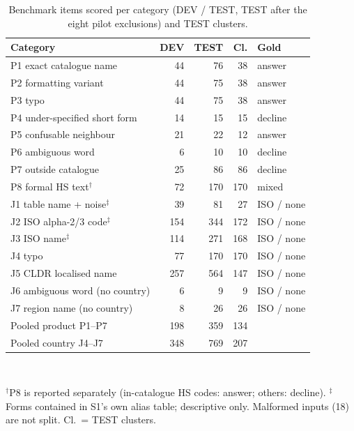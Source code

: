 \begin{table}[t]
\centering
\caption{Benchmark items scored per category (DEV / TEST, TEST after the eight pilot exclusions) and TEST clusters.}
\label{tab:bench}
\footnotesize
\setlength{\tabcolsep}{3pt}
\begin{tabular}{@{}lrrrl@{}}
\toprule
Category & DEV & TEST & Cl. & Gold \\
\midrule
P1 exact catalogue name & 44 & 76 & 38 & answer \\
P2 formatting variant & 44 & 75 & 38 & answer \\
P3 typo & 44 & 75 & 38 & answer \\
P4 under-specified short form & 14 & 15 & 15 & decline \\
P5 confusable neighbour & 21 & 22 & 12 & answer \\
P6 ambiguous word & 6 & 10 & 10 & decline \\
P7 outside catalogue & 25 & 86 & 86 & decline \\
P8 formal HS text$^\dagger$ & 72 & 170 & 170 & mixed \\
\midrule
J1 table name + noise$^\ddagger$ & 39 & 81 & 27 & ISO / none \\
J2 ISO alpha-2/3 code$^\ddagger$ & 154 & 344 & 172 & ISO / none \\
J3 ISO name$^\ddagger$ & 114 & 271 & 168 & ISO / none \\
J4 typo & 77 & 170 & 170 & ISO / none \\
J5 CLDR localised name & 257 & 564 & 147 & ISO / none \\
J6 ambiguous word (no country) & 6 & 9 & 9 & ISO / none \\
J7 region name (no country) & 8 & 26 & 26 & ISO / none \\
\midrule
Pooled product P1--P7 & 198 & 359 & 134 & \\
Pooled country J4--J7 & 348 & 769 & 207 & \\
\bottomrule
\end{tabular}
\\[2pt]\parbox{\columnwidth}{\scriptsize $^\dagger$P8 is reported separately (in-catalogue HS codes: answer; others: decline). $^\ddagger$Forms contained in S1's own alias table; descriptive only. Malformed inputs (18) are not split. Cl.\ = TEST clusters.}
\end{table}
